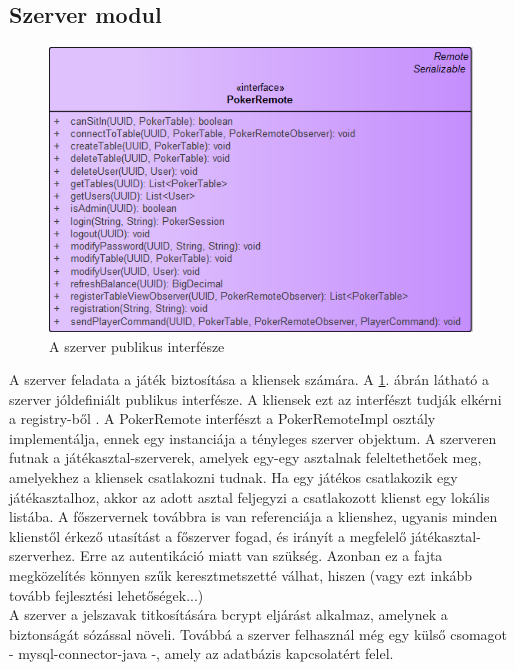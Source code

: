 




\subsection{Szerver modul}
\begin{figure}[h!]
  \caption{A szerver publikus interfésze}
  \label{fig:server_public}
  \centering
    \includegraphics[width=\textwidth]{user-documentation/images/server_remote.png}
\end{figure}
A szerver feladata a játék biztosítása a kliensek számára. A \ref{fig:server_public}. ábrán látható a szerver jóldefiniált publikus interfésze. A kliensek ezt az interfészt tudják elkérni a registry-ből \cite{RMI}. A PokerRemote interfészt a PokerRemoteImpl osztály implementálja, ennek egy instanciája a tényleges szerver objektum. A szerveren futnak a játékasztal-szerverek, amelyek egy-egy asztalnak feleltethetőek meg, amelyekhez a kliensek csatlakozni tudnak. Ha egy játékos csatlakozik egy játékasztalhoz, akkor az adott asztal feljegyzi a csatlakozott klienst egy lokális listába. A főszervernek továbbra is van referenciája a klienshez, ugyanis minden klienstől érkező utasítást a főszerver fogad, és irányít a megfelelő játékasztal-szerverhez. Erre az autentikáció miatt van szükség. Azonban ez a fajta megközelítés könnyen szűk keresztmetszetté válhat, hiszen (vagy ezt inkább tovább fejlesztési lehetőségek...) \\
A szerver a jelszavak titkosítására bcrypt eljárást alkalmaz, amelynek a biztonságát sózással növeli. Továbbá a szerver felhasznál még egy külső csomagot - mysql-connector-java -, amely az adatbázis kapcsolatért felel.


